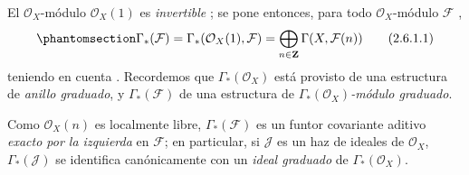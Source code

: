\documentclass[oneside,10pt]{amsart}
\let\EGAOriginalLabel\label
\renewcommand{\label}[1]{\phantomsection\EGAOriginalLabel{#1}}
\begin{document}
\begin{env}[2.6.1]
\label{II.2.6.1-fr}
El $\mathcal{O}_X$-módulo $\mathcal{O}_X(1)$ es \emph{invertible} ; se pone entonces, para todo $\mathcal{O}_X$-módulo $\mathcal{F}$ ,
\[
\label{II.2.6.1.1-fr}
  \Gamma_*(\mathcal{F})
  =\Gamma_*(\mathcal{O}_X(1),\mathcal{F})
  =\bigoplus_{n\in\mathbf{Z}}\Gamma(X,\mathcal{F}(n))
\tag{2.6.1.1}
\]
teniendo en cuenta .
Recordemos  que $\Gamma_*(\mathcal{O}_X)$ está provisto de una estructura de \emph{anillo graduado}, y $\Gamma_*(\mathcal{F})$ de una estructura de \emph{$\Gamma_*(\mathcal{O}_X)$-módulo graduado}.

Como $\mathcal{O}_X(n)$ es localmente libre, $\Gamma_*(\mathcal{F})$ es un funtor covariante aditivo \emph{exacto por la izquierda} en $\mathcal{F}$; en particular, si $\mathcal{J}$ es un haz de ideales de $\mathcal{O}_X$, $\Gamma_*(\mathcal{J})$ se identifica canónicamente con un \emph{ideal graduado} de $\Gamma_*(\mathcal{O}_X)$.
\end{env}
\end{document}
